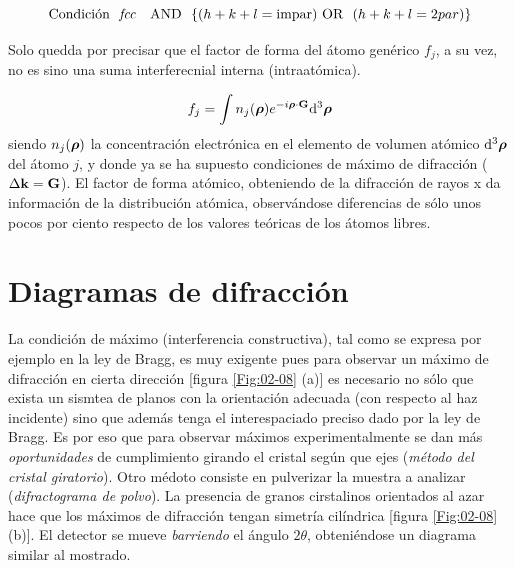 \begin{equation*}
 \text{Condición \ \textit{fcc}\ \ \ AND} \ \ \{ (h+k+l=\text{impar}) \text{\ OR \ } (h+k+l=2 par) \}
\end{equation*}

Solo quedda por precisar que el factor de forma del átomo genérico $f_j$, a su vez, no es sino una suma interferecnial interna (intraatómica). \

\begin{equation}
    f_j = \int n_j (\boldsymbol{\rho}) e^{-i \boldsymbol{\rho} \cdot \mathbf{G}} \mathrm{d}^3 \boldsymbol{\rho}
\end{equation}
siendo $n_j (\boldsymbol{\rho})$ la concentración electrónica en el elemento de volumen atómico $\mathrm{d}^3 \boldsymbol{\rho}$ del átomo $j$, y donde ya se ha supuesto condiciones de máximo de difracción ($\Delta \mathbf{k}  = \mathbf{G}$). El factor de forma atómico, obteniendo de la difracción de rayos x da información de la distribución atómica, observándose diferencias de sólo unos pocos por ciento respecto de los valores teóricas de los átomos libres.

\section{Diagramas de difracción}

La condición de máximo (interferencia constructiva), tal como se expresa por ejemplo en la ley de Bragg, es muy exigente pues para observar un máximo de difracción en cierta dirección [figura \ref{Fig:02-08} (a)] es necesario no sólo que exista un sismtea de planos con la orientación adecuada (con respecto al haz incidente) sino que además tenga el interespaciado preciso dado por la ley de Bragg. Es por eso que para observar máximos experimentalmente se dan más \textit{oportunidades} de cumplimiento girando el cristal según que ejes (\textit{método del cristal giratorio}). Otro médoto consiste en pulverizar la muestra a analizar (\textit{difractograma de polvo}). La presencia de granos cirstalinos orientados al azar hace que los máximos de difracción tengan simetría cilíndrica [figura \ref{Fig:02-08} (b)]. El detector se mueve \textit{barriendo} el ángulo $2\theta$, obteniéndose un diagrama similar al mostrado. 

